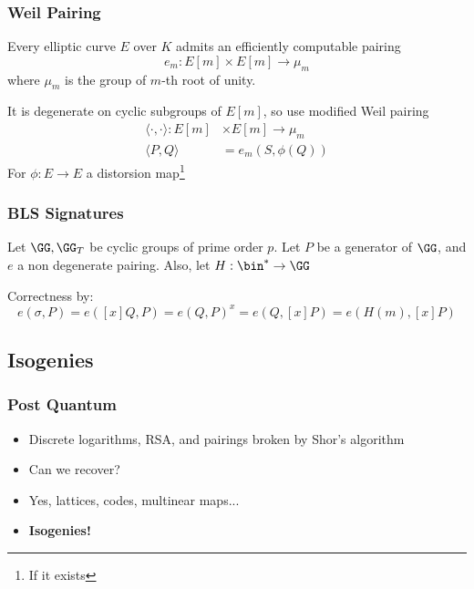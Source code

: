 \documentclass{beamer}
\begin{document}
\begin{frame}
    \frametitle{Weil Pairing}
    Every elliptic curve $E$ over $K$ admits an efficiently computable pairing
    \[ e_m : E[m] \times E[m] \to \mu_m \]
    where $\mu_m$ is the group of $m$-th root of unity. 

    It is degenerate on cyclic subgroups of $E[m]$, so use modified Weil pairing
    \begin{align*}
        \langle \cdot , \cdot \rangle : E[m] &\times E[m] \to \mu_m \\
        \langle P, Q \rangle &= e_m(S, \phi(Q))
    \end{align*}
    For $\phi: E \to E$ a distorsion map\footnote{If it exists}

\end{frame}

\begin{frame}
    \frametitle{BLS Signatures}
    Let $\GG, \GG_T$ be cyclic groups of prime order $p$. Let $P$ be a generator of $\GG$, and $e$ a non degenerate pairing.
    Also, let $H: \bin^* \to \GG$
    \begin{center}
        
    \begin{pcvstack}
        \begin{pchstack}

        \end{pchstack}


    \end{pcvstack}
    \end{center}
    Correctness by:
    \[ e(\sigma, P) = e([x]Q, P) = e(Q, P)^x = e(Q, [x]P) = e(H(m), [x]P) \]
 
\end{frame}

\subsection{Isogenies}
\begin{frame}
    \frametitle{Post Quantum}
    \begin{itemize}
        \item<1-> Discrete logarithms, RSA, and pairings broken by Shor's algorithm
        \item<2-> Can we recover?
        \item<3-> Yes, lattices, codes, multinear maps...
        \item<4-> \textbf{Isogenies!}
    \end{itemize}
\end{frame}
\end{document}
